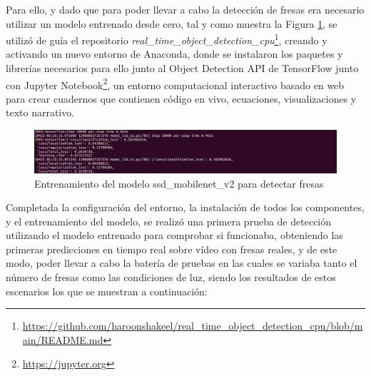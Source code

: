 Para ello, y dado que para poder llevar a cabo la detección de fresas era necesario utilizar un modelo entrenado desde cero, tal y como muestra la Figura \ref{fig:entrenamiento_ssdmobilenet}, se utilizó de guía el repositorio \textit{real\_time\_object\_detection\_cpu}\footnote{\url{https://github.com/haroonshakeel/real_time_object_detection_cpu/blob/main/README.md}}, creando y activando un nuevo entorno de Anaconda, donde se instalaron los paquetes y librerías necesarios para ello junto al Object Detection API de TensorFlow junto con Jupyter Notebook\footnote{\url{https://jupyter.org}}, un entorno computacional interactivo basado en web para crear cuadernos que contienen código en vivo, ecuaciones, visualizaciones y texto narrativo. 

 \begin{figure} [H]
  \begin{center}
    \includegraphics[width=150mm]{figs/tensorflow step 10000.png}
  \end{center}
  \caption{Entrenamiento del modelo ssd\_mobilenet\_v2 para detectar fresas}
  \label{fig:entrenamiento_ssdmobilenet}
 \end{figure}

Completada la configuración del entorno, la instalación de todos los componentes, y el entrenamiento del modelo, se realizó una primera prueba de detección utilizando el modelo entrenado para comprobar si funcionaba, obteniendo las primeras predicciones en tiempo real sobre vídeo con fresas reales, y de este modo, poder llevar a cabo la batería de pruebas en las cuales se variaba tanto el número de fresas como las condiciones de luz, siendo los resultados de estos escenarios los que se muestran a continuación:
\pagebreak

